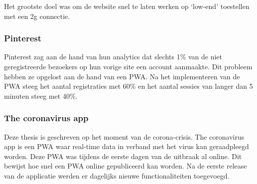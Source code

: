 		Het grootste doel was om de website snel te laten werken op ‘low-end’ toestellen met een 2g connectie. 
		\autocite{Croll2017}
	
	\subsubsection{Pinterest}
	
		Pinterest zag aan de hand van hun analytics dat slechts 1\% van de niet geregistreerde bezoekers op hun vorige site een account aanmaakte. Dit probleem hebben ze opgelost aan de hand van een PWA.
		Na het implementeren van de PWA steeg het aantal registraties met 60\% en het aantal sessies van langer dan 5 minuten steeg met 40\%.
		\autocite{Osmani2019b}
		
		
	\subsubsection{The coronavirus app}
	
		Deze thesis is geschreven op het moment van de corona-crisis. The coronavirus app is een PWA waar real-time data in verband met het virus kan geraadpleegd worden. 
		Deze PWA was tijdens de eerste dagen van de uitbraak al online. Dit bewijst hoe snel een PWA online gepubliceerd kan worden.
		Na de eerste release van de applicatie werden er dagelijks nieuwe functionaliteiten toegevoegd. 
		
	

